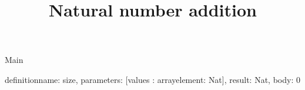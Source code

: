 \begin{lexlean}{Main}
\title{Natural number addition}
\begin{semanticmodule}
definition{name: size, parameters: [values : array{element: Nat}], result: Nat, body: 0}
\end{semanticmodule}
\end{lexlean}
